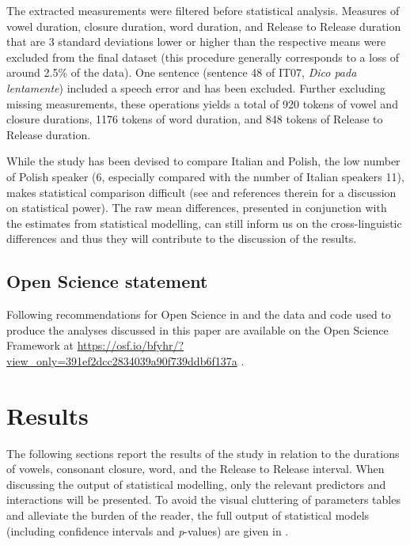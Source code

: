 \documentclass[12pt,]{article}
\begin{document}
The extracted measurements were filtered before statistical analysis.
Measures of vowel duration, closure duration, word duration, and Release
to Release duration that are 3 standard deviations lower or higher than
the respective means were excluded from the final dataset (this
procedure generally corresponds to a loss of around 2.5\% of the data).
One sentence (sentence 48 of IT07, \emph{Dico pada lentamente}) included
a speech error and has been excluded. Further excluding missing
measurements, these operations yields a total of 920 tokens of vowel and
closure durations, 1176 tokens of word duration, and 848 tokens of
Release to Release duration.

While the study has been devised to compare Italian and Polish, the low
number of Polish speaker (6, especially compared with the number of
Italian speakers 11), makes statistical comparison difficult (see
\citealt{kirby2018} and references therein for a discussion on
statistical power). The raw mean differences, presented in conjunction
with the estimates from statistical modelling, can still inform us on
the cross-linguistic differences and thus they will contribute to the
discussion of the results.

\hypertarget{open-science-statement}{%
\subsection{Open Science statement}\label{open-science-statement}}

Following recommendations for Open Science in \citet{cruwell2018} and
\citet{berez-kroeker2018} the data and code used to produce the analyses
discussed in this paper are available on the Open Science Framework at
\url{https://osf.io/bfyhr/?view_only=391ef2dcc2834039a90f739ddb6f137a}
\citep{coretta2018g}.

\hypertarget{results}{%
\section{Results}\label{results}}

The following sections report the results of the study in relation to
the durations of vowels, consonant closure, word, and the Release to
Release interval. When discussing the output of statistical modelling,
only the relevant predictors and interactions will be presented. To
avoid the visual cluttering of parameters tables and alleviate the
burden of the reader, the full output of statistical models (including
confidence intervals and \emph{p}-values) are given in .
\end{document}
